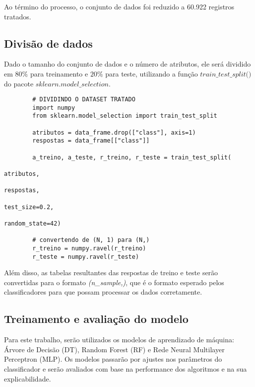 \documentclass[12pt,a4paper]{article}
\begin{document}
\vspace{0.15cm}
\quad\space Ao término do processo, o conjunto de dados foi reduzido a 60.922 registros tratados.

\subsection{Divisão de dados}

\quad\space Dado o tamanho do conjunto de dados e o número de atributos, ele será dividido em $80\%$ para treinamento e $20\%$ para teste, utilizando a função $\textit{train$$\_$$test$$\_$$split()}$ do pacote $\textit{sklearn.model$$\_$$selection}$.

\begin{mdframed}[userdefinedwidth=\linewidth]
	\begin{verbatim}
		# DIVIDINDO O DATASET TRATADO
		import numpy
		from sklearn.model_selection import train_test_split

		atributos = data_frame.drop(["class"], axis=1)
		respostas = data_frame[["class"]]

		a_treino, a_teste, r_treino, r_teste = train_test_split(
																																									atributos, 
																																									respostas, 
																																									test_size=0.2, 
																																									random_state=42)

		# convertendo de (N, 1) para (N,)
		r_treino = numpy.ravel(r_treino)
		r_teste = numpy.ravel(r_teste)
		\end{verbatim}
\end{mdframed}

\vspace{0.15cm}
\quad\space Além disso, as tabelas resultantes das respostas de treino e teste serão convertidas para o formato \textit{(n\_sample,)}, que é o formato esperado pelos classificadores para que possam processar os dados corretamente.

\subsection{Treinamento e avaliação do modelo}

\quad\space Para este trabalho, serão utilizados os modelos de aprendizado de máquina: Árvore de Decisão (DT), Random Forest (RF) e Rede Neural Multilayer Perceptron (MLP). Os modelos passarão por ajustes nos parâmetros do classificador e serão avaliados com base na performance dos algoritmos e na sua explicabilidade.
\end{document}
